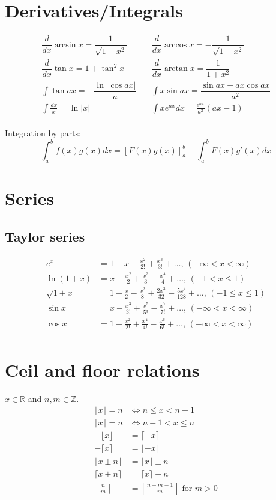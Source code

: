 \section{Derivatives/Integrals}
\begin{align*}
\dfrac{d}{dx}\arcsin x = \dfrac{1}{\sqrt{1-x^2}} & \quad
\dfrac{d}{dx}\arccos x = -\dfrac{1}{\sqrt{1-x^2}}\\
\dfrac{d}{dx}\tan x = 1+\tan^2 x & \quad
\dfrac{d}{dx}\arctan x = \dfrac{1}{1+x^2}\\
\int\tan ax = -\dfrac{\ln|\cos ax|}{a} & \quad
\int x\sin ax = \dfrac{\sin ax-ax \cos ax}{a^2}\\
\int \frac{dx}{x} = \ln|x| & \quad
\int xe^{ax}dx = \frac{e^{ax}}{a^2}(ax-1)\\
\end{align*}

Integration by parts:
$$\int_a^bf(x)g(x)dx = [F(x)g(x)]_a^b-\int_a^bF(x)g'(x)dx$$

\section{Series} 
\subsection{Taylor series}
\begin{align*}
e^x &= 1+x+\frac{x^2}{2!}+\frac{x^3}{3!}+\dots,\,(-\infty<x<\infty)\\
\ln(1+x) &= x-\frac{x^2}{2}+\frac{x^3}{3}-\frac{x^4}{4}+\dots,\,(-1<x\leq1)\\
\sqrt{1+x} &= 1+\frac{x}{2}-\frac{x^2}{8}+\frac{2x^3}{32}-\frac{5x^4}{128}+\dots,\,(-1\leq x\leq1)\\
\sin x &= x-\frac{x^3}{3!}+\frac{x^5}{5!}-\frac{x^7}{7!}+\dots,\,(-\infty<x<\infty)\\
\cos x &= 1-\frac{x^2}{2!}+\frac{x^4}{4!}-\frac{x^6}{6!}+\dots,\,(-\infty<x<\infty)\\
\end{align*}

\section{Ceil and floor relations}
$x\in\mathbb R$ and $n,m\in\mathbb Z$.
\begin{align*}
\lfloor x \rfloor = n &\Leftrightarrow n\leq x < n+1\\
\lceil x \rceil = n &\Leftrightarrow n-1< x \leq n\\
-\lfloor x \rfloor & = \lceil -x \rceil\\
-\lceil x \rceil & = \lfloor -x \rfloor\\
\lfloor x\pm n \rfloor & = \lfloor x \rfloor\pm n\\
\lceil x\pm n \rceil & = \lceil x \rceil\pm n\\
\left\lceil \frac nm \right\rceil & = \left\lfloor \frac{n+m-1}{m} \right\rfloor \textrm{ for } m>0\\
\end{align*}

